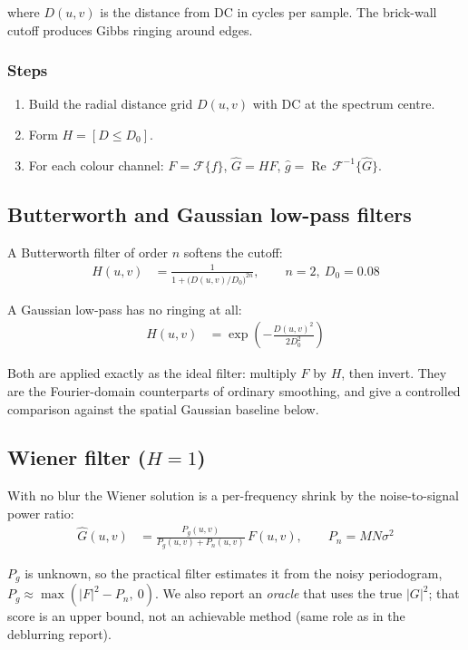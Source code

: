 \documentclass[10pt,twocolumn,letterpaper]{article}
\begin{document}
\noindent where $D(u,v)$ is the distance from DC in cycles per sample.  The brick-wall
cutoff produces Gibbs ringing around edges.

\subsubsection*{Steps}

\begin{enumerate}
  \item Build the radial distance grid $D(u,v)$ with DC at the spectrum centre.
  \item Form $H = [D \le D_0]$.
  \item For each colour channel: $F = \mathcal{F}\{f\}$,
        $\hat{G} = H F$,
        $\hat{g} = \operatorname{Re}\,\mathcal{F}^{-1}\{\hat{G}\}$.
\end{enumerate}

\subsection*{Butterworth and Gaussian low-pass filters}

A Butterworth filter of order $n$ softens the cutoff:
\begin{align}
  H(u,v) &= \frac{1}{1 + \bigl(D(u,v)/D_0\bigr)^{2n}},
  \qquad n = 2,\ D_0 = 0.08
\end{align}

\noindent A Gaussian low-pass has no ringing at all:
\begin{align}
  H(u,v) &= \exp\!\left(-\frac{D(u,v)^{2}}{2 D_0^{2}}\right)
\end{align}

\noindent Both are applied exactly as the ideal filter: multiply $F$ by $H$, then
invert.  They are the Fourier-domain counterparts of ordinary smoothing, and give a
controlled comparison against the spatial Gaussian baseline below.

\newpage
\subsection*{Wiener filter ($H = 1$)}

With no blur the Wiener solution is a per-frequency shrink by the noise-to-signal
power ratio:
\begin{align}
  \hat{G}(u,v) &= \frac{P_g(u,v)}{P_g(u,v) + P_n(u,v)}\,F(u,v),
  \qquad P_n = MN\sigma^{2}
\end{align}

\noindent $P_g$ is unknown, so the practical filter estimates it from the noisy
periodogram, $P_g \approx \max(|F|^{2} - P_n,\ 0)$.  We also report an
\emph{oracle} that uses the true $|G|^{2}$; that score is an upper bound, not an
achievable method (same role as in the deblurring report).
\end{document}
